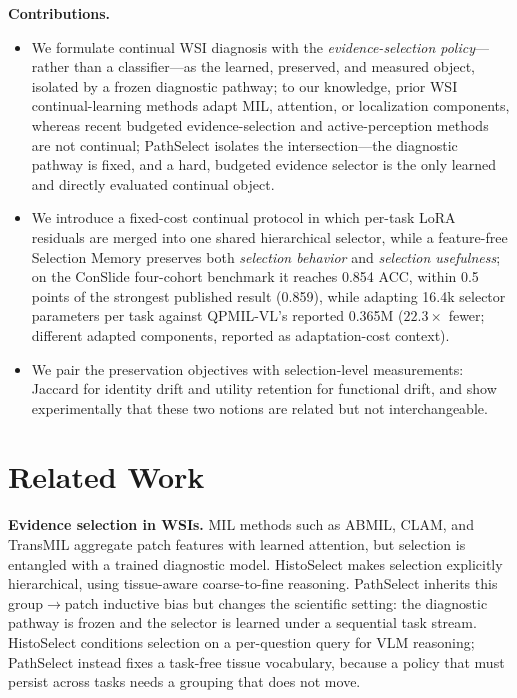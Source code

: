 \documentclass{article}
\begin{document}
\textbf{Contributions.}
\begin{itemize}
    \item We formulate continual WSI diagnosis with the \emph{evidence-selection policy}---rather than a classifier---as the learned, preserved, and measured object, isolated by a frozen diagnostic pathway; to our knowledge, prior WSI continual-learning methods adapt MIL, attention, or localization components, whereas recent budgeted evidence-selection and active-perception methods are not continual; PathSelect isolates the intersection---the diagnostic pathway is fixed, and a hard, budgeted evidence selector is the only learned and directly evaluated continual object.
    \item We introduce a fixed-cost continual protocol in which per-task LoRA residuals are merged into one shared hierarchical selector, while a feature-free Selection Memory preserves both \emph{selection behavior} and \emph{selection usefulness}; on the ConSlide four-cohort benchmark it reaches 0.854 ACC, within 0.5 points of the strongest published result (0.859), while adapting 16.4k selector parameters per task against QPMIL-VL's reported 0.365M ($22.3\times$ fewer; different adapted components, reported as adaptation-cost context).
    \item We pair the preservation objectives with selection-level measurements: Jaccard for identity drift and utility retention for functional drift, and show experimentally that these two notions are related but not interchangeable.
\end{itemize}

\section{Related Work}
\label{sec:related}

\textbf{Evidence selection in WSIs.}
MIL methods such as ABMIL, CLAM, and TransMIL \cite{ilse2018abmil,lu2021clam,shao2021transmil} aggregate patch features with learned attention, but selection is entangled with a trained diagnostic model.
HistoSelect \cite{huang2026histoselect} makes selection explicitly hierarchical, using tissue-aware coarse-to-fine reasoning.
PathSelect inherits this group$\rightarrow$patch inductive bias but changes the scientific setting: the diagnostic pathway is frozen and the selector is learned under a sequential task stream. HistoSelect conditions selection on a per-question query for VLM reasoning; PathSelect instead fixes a task-free tissue vocabulary, because a policy that must persist across tasks needs a grouping that does not move.
\end{document}
